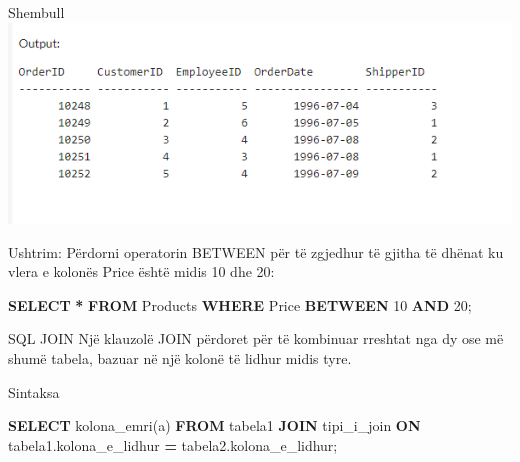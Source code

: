 \documentclass[
  ignorenonframetext,
]{beamer}
\newenvironment{Shaded}{\begin{snugshade}}{\end{snugshade}}
\newcommand{\DecValTok}[1]{\textcolor[rgb]{0.00,0.00,0.81}{#1}}
\newcommand{\KeywordTok}[1]{\textcolor[rgb]{0.13,0.29,0.53}{\textbf{#1}}}
\newcommand{\NormalTok}[1]{#1}
\newcommand{\OperatorTok}[1]{\textcolor[rgb]{0.81,0.36,0.00}{\textbf{#1}}}
\begin{document}
\begin{frame}{Shembull}
\label{shembull-28}
\includegraphics{./Figs/query83.png}
\end{frame}

\begin{frame}[fragile]{Ushtrim: Përdorni operatorin BETWEEN për të
zgjedhur të gjitha të dhënat ku vlera e kolonës Price është midis 10 dhe
20:}
\label{ushtrim-puxebrdorni-operatorin-between-puxebr-tuxeb-zgjedhur-tuxeb-gjitha-tuxeb-dhuxebnat-ku-vlera-e-kolonuxebs-price-uxebshtuxeb-midis-10-dhe-20}

\begin{Shaded}
\begin{Highlighting}[]
\KeywordTok{SELECT} \OperatorTok{*}
\KeywordTok{FROM}\NormalTok{ Products}
\KeywordTok{WHERE}\NormalTok{ Price }\KeywordTok{BETWEEN} \DecValTok{10} \KeywordTok{AND} \DecValTok{20}\NormalTok{;}
\end{Highlighting}
\end{Shaded}
\end{frame}

\begin{frame}{SQL JOIN}
\label{sql-join}
Një klauzolë JOIN përdoret për të kombinuar rreshtat nga dy ose më shumë
tabela, bazuar në një kolonë të lidhur midis tyre.
\end{frame}

\begin{frame}[fragile]{Sintaksa}
\label{sintaksa-3}

\begin{Shaded}
\begin{Highlighting}[]
\KeywordTok{SELECT}\NormalTok{ kolona\_emri(a)}
\KeywordTok{FROM}\NormalTok{ tabela1}
\KeywordTok{JOIN}\NormalTok{ tipi\_i\_join}
\KeywordTok{ON}\NormalTok{ tabela1.kolona\_e\_lidhur }\OperatorTok{=}\NormalTok{ tabela2.kolona\_e\_lidhur;}
\end{Highlighting}
\end{Shaded}
\end{frame}
\end{document}
